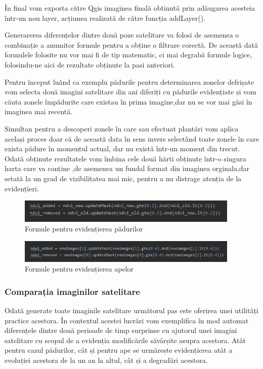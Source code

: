 \documentclass[12pt,a4paper]{article}
\theoremstyle{definition}
\theoremstyle{remark}
\begin{document}
În final vom exporta către Qgis imaginea finală obtinută prin adăugarea acesteia într-un nou layer, acțiunea realizată de către funcția addLayer().

Generarerea diferențelor dintre două poze satelitare va folosi de asemenea o combinație a anumitor formule pentru a obține o filtrare corectă. De această dată formulele folosite nu vor mai fi de tip matematic, ci mai degrabă formule logice, folosindu-ne aici de rezultate obținute la pasi anteriori. 

Pentru început luând ca exemplu pădurile pentru determinarea zonelor defrișate vom selecta două imagini satelitare din ani diferiți cu pădurile evidențiate și vom căuta zonele împădurite care existau în prima imagine,dar nu se vor mai găsi în imaginea mai recentă.

Simultan pentru a descoperi zonele în care sau efectuat plantări vom aplica același proces doar că de această data în sens invers selectând toate zonele în care exista pădure în momentul actual, dar nu există într-un moment din trecut. Odată obținute rezultatele vom îmbina cele două hărti obținute într-o singura harta care va conține ,de asemenea un fundal format din imaginea orginala,dar setată la un grad de vizibilitatea mai mic, pentru a nu distrage atenția de la evidențieri.

\begin{figure}[H]
  \centering
  \includegraphics[width=300pt]{formuleevidentierindvi..PNG}
  \caption{Formule pentru evidențierea pădurilor }   
\end{figure}

\begin{figure}[H]
  \centering
  \includegraphics[width=300pt]{formule evidentierindwi.PNG}
  \caption{Formule pentru evidențierea apelor }   
\end{figure}


\subsubsection{Comparația imaginilor satelitare}
Odată generate toate imaginile satelitare următorul pas este oferirea unei utilități practice acestora. În contextul acestei lucrări vom exemplifica în mod automat diferențele dintre două perioade de timp surprinse cu ajutorul unei imagini satelitare cu scopul de a evidenția modificările săvârșite asupra acestora. Atât pentru cazul pădurilor, cât și pentru ape se urmărește evidențierea atât a evoluției acestora de la un an la altul, cât și a degradări acestora. 
\end{document}
